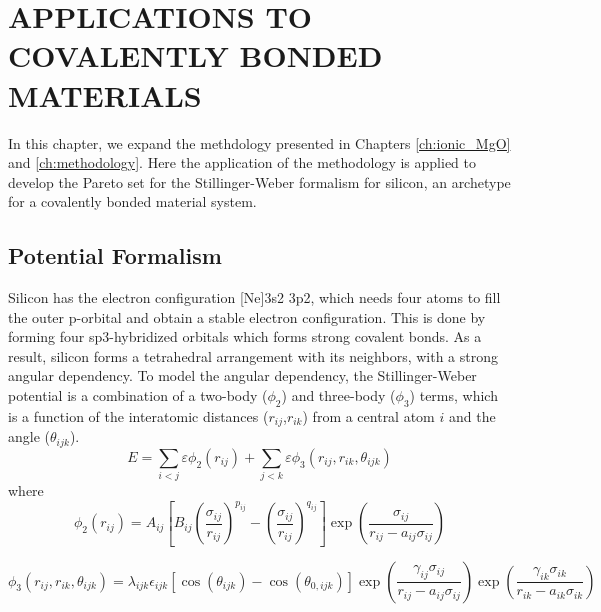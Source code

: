 \chapter{APPLICATIONS TO COVALENTLY BONDED MATERIALS}
\label{ch:pareto_si}

In this chapter, we expand the methdology presented in Chapters \ref{ch:ionic_MgO} and \ref{ch:methodology}.  Here the application of the methodology is applied to develop the Pareto set for the Stillinger-Weber formalism\cite{stillinger1985_sw} for silicon, an archetype for a covalently bonded material system.

\section{Potential Formalism}
Silicon has the electron configuration [Ne]3s2 3p2, which needs four atoms to fill the outer p-orbital and obtain a stable electron configuration.  This is done by forming four sp3-hybridized orbitals which forms strong covalent bonds.  As a result, silicon forms a tetrahedral arrangement with its neighbors, with a strong angular dependency.  To model the angular dependency, the Stillinger-Weber potential\cite{stillinger1985_sw} is a combination of a two-body ($\phi_2$) and three-body ($\phi_3$) terms, which is a function of the interatomic distances ($r_{ij}$,$r_{ik}$) from a central atom $i$ and the angle ($\theta_{ijk}$).
\begin{equation}
    E = \sum_{i<j}\varepsilon \phi_2 (r_{ij})
        +\sum_{j<k}\varepsilon \phi_3 (r_{ij},r_{ik},\theta_{ijk})
\end{equation}
where
\begin{equation}
    \phi_2(r_{ij})=A_{ij} \left[
        B_{ij}
        \left(\frac{\sigma_{ij}}{r_{ij}}\right)^{p_{ij}}
        - \left(\frac{\sigma_{ij}}{r_{ij}}\right)^{q_{ij}}
    \right]
    \exp\left(\frac{\sigma_{ij}}{r_{ij}-a_{ij}\sigma_{ij}}\right)
\end{equation}

\begin{equation}
    \phi_3(r_{ij},r_{ik},\theta_{ijk}) =
        \lambda_{ijk}
        \epsilon_{ijk}
        \left[
            \cos(\theta_{ijk}) - \cos(\theta_{0,ijk})
        \right]
        \exp\left(\frac{\gamma_{ij}\sigma_{ij}}
                       {r_{ij}-a_{ij}\sigma_{ij}}
            \right)
        \exp\left(\frac{\gamma_{ik}\sigma_{ik}}
                       {r_{ik}-a_{ik}\sigma_{ik}}
            \right)
\end{equation}

